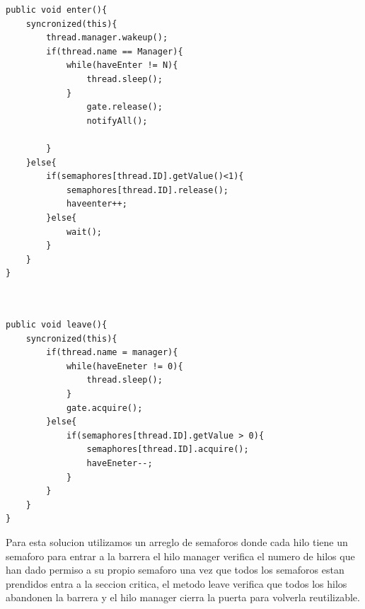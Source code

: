 \documentclass[12pt, letterpaper]{article}
\begin{document}
\begin{itemize}
\begin{lstlisting}
public void enter(){
	syncronized(this){
		thread.manager.wakeup();
		if(thread.name == Manager){
			while(haveEnter != N){
				thread.sleep();			
			}
				gate.release();
				notifyAll();			
					
		}	
	}else{
		if(semaphores[thread.ID].getValue()<1){
			semaphores[thread.ID].release();
			haveenter++;		
		}else{
			wait();		
		}
	}
}


\end{lstlisting}

\begin{lstlisting}

public void leave(){
	syncronized(this){
		if(thread.name = manager){
			while(haveEneter != 0){
				thread.sleep();			
			}	
			gate.acquire();
		}else{
			if(semaphores[thread.ID].getValue > 0){
				semaphores[thread.ID].acquire();
				haveEneter--;			
			}
		}
	}
}

\end{lstlisting}

Para esta solucion utilizamos un arreglo de semaforos donde cada hilo tiene un semaforo para entrar a la barrera el hilo manager verifica el numero de hilos que han dado permiso a su propio semaforo una vez que todos los semaforos estan prendidos entra a la seccion critica, el metodo leave verifica que todos los hilos abandonen la barrera y el hilo manager cierra la puerta para volverla reutilizable.


\end{itemize}
\end{document}
